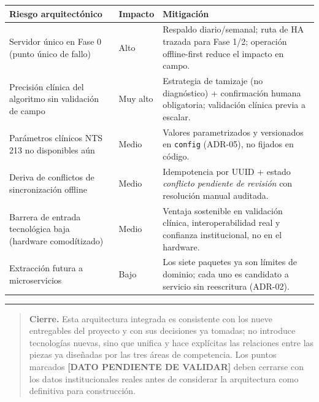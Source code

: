 \documentclass[11pt,a4paper]{article}
\begin{document}
{\small
\begin{longtable}[]{@{}
  >{\raggedright\arraybackslash}p{}
  >{\raggedright\arraybackslash}p{}
  >{\raggedright\arraybackslash}p{}@{}}
\toprule\noalign{}
Riesgo arquitect\'onico & Impacto & Mitigaci\'on \\
\midrule\noalign{}
\endhead
\bottomrule\noalign{}
\endlastfoot
Servidor \'unico en Fase 0 (punto \'unico de fallo) & Alto & Respaldo diario/semanal; ruta de HA trazada para Fase 1/2; operaci\'on offline-first reduce el impacto en campo. \\
Precisi\'on cl\'inica del algoritmo sin validaci\'on de campo & Muy alto & Estrategia de tamizaje (no diagn\'ostico) + confirmaci\'on humana obligatoria; validaci\'on cl\'inica previa a escalar. \\
Par\'ametros cl\'inicos NTS 213 no disponibles a\'un & Medio & Valores parametrizados y versionados en \texttt{config} (ADR-05), no fijados en c\'odigo. \\
Deriva de conflictos de sincronizaci\'on offline & Medio & Idempotencia por UUID + estado \emph{conflicto pendiente de revisi\'on} con resoluci\'on manual auditada. \\
Barrera de entrada tecnol\'ogica baja (hardware comod\'itizado) & Medio & Ventaja sostenible en validaci\'on cl\'inica, interoperabilidad real y confianza institucional, no en el hardware. \\
Extracci\'on futura a microservicios & Bajo & Los siete paquetes ya son l\'imites de dominio; cada uno es candidato a servicio sin reescritura (ADR-02). \\
\end{longtable}
}

\begin{center}\rule{0.5\linewidth}{0.5pt}\end{center}

\begin{quote}
\textbf{Cierre.} Esta arquitectura integrada es consistente con los nueve entregables del proyecto y con sus decisiones ya tomadas; no introduce tecnolog\'ias nuevas, sino que unifica y hace expl\'icitas las relaciones entre las piezas ya dise\~nadas por las tres \'areas de competencia. Los puntos marcados \textbf{{[}DATO PENDIENTE DE VALIDAR{]}} deben cerrarse con los datos institucionales reales antes de considerar la arquitectura como definitiva para construcci\'on.
\end{quote}
\end{document}
